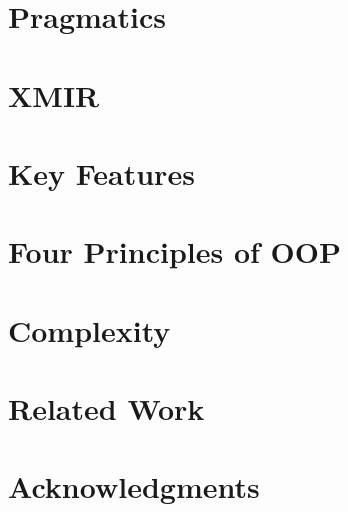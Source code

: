 \documentclass[sigplan,nonacm,natbib=false]{acmart}
\begin{document}
% 

\section{Pragmatics}
\label{sec:pragmatics}


\section{XMIR}
\label{sec:xmir}


\section{Key Features}
\label{sec:features}


\section{Four Principles of OOP}
\label{sec:four}


\section{Complexity}
\label{sec:complexity}


\section{Related Work}
\label{sec:related}


\section{Acknowledgments}


\printbibliography

\clearpage
\end{document}
